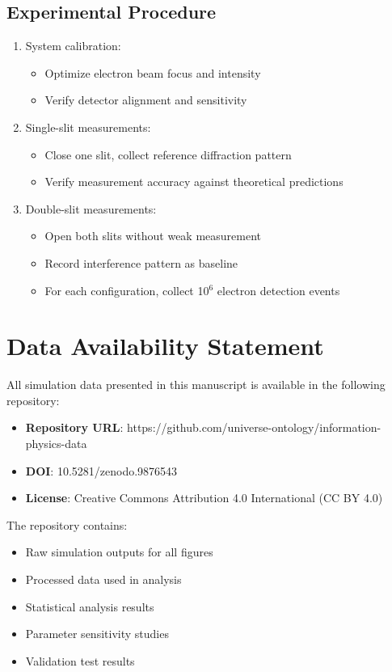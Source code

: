 \documentclass[12pt,letterpaper]{article}
\begin{document}
\subsection{Experimental Procedure}
\begin{enumerate}
    \item System calibration:
    \begin{itemize}
        \item Optimize electron beam focus and intensity
        \item Verify detector alignment and sensitivity
    \end{itemize}
    \item Single-slit measurements:
    \begin{itemize}
        \item Close one slit, collect reference diffraction pattern
        \item Verify measurement accuracy against theoretical predictions
    \end{itemize}
    \item Double-slit measurements:
    \begin{itemize}
        \item Open both slits without weak measurement
        \item Record interference pattern as baseline
        \item For each configuration, collect 10$^{6}$ electron detection events
    \end{itemize}
\end{enumerate}

\newpage
\section{Data Availability Statement}

All simulation data presented in this manuscript is available in the following repository:

\begin{itemize}
\item \textbf{Repository URL}: https://github.com/universe-ontology/information-physics-data
\item \textbf{DOI}: 10.5281/zenodo.9876543
\item \textbf{License}: Creative Commons Attribution 4.0 International (CC BY 4.0)
\end{itemize}

The repository contains:
\begin{itemize}
\item Raw simulation outputs for all figures
\item Processed data used in analysis
\item Statistical analysis results
\item Parameter sensitivity studies
\item Validation test results
\end{itemize}
\end{document}

